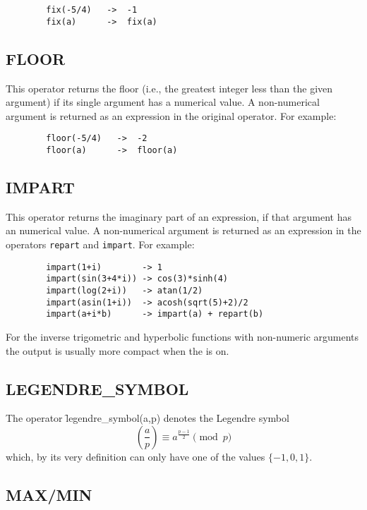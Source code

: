 \begin{verbatim}
        fix(-5/4)   ->  -1
        fix(a)      ->  fix(a)
\end{verbatim}

\subsection{FLOOR}
\hypertarget{operator:FLOOR}{}
This operator returns the floor (i.e., the greatest integer less than
the given argument) if its single argument has a numerical value.  A
non-numerical argument is returned as an expression in the original
operator.  For example:

\begin{verbatim}
        floor(-5/4)   ->  -2
        floor(a)      ->  floor(a)
\end{verbatim}

\subsection{IMPART}
\hypertarget{operator:IMPART}{}
This operator returns the imaginary part of an expression, if that argument
has an numerical value.  A non-numerical argument is returned as an expression
in the operators \texttt{repart} and \texttt{impart}.  For example:
\begin{verbatim}
        impart(1+i)        -> 1
        impart(sin(3+4*i)) -> cos(3)*sinh(4)
        impart(log(2+i))   -> atan(1/2)
        impart(asin(1+i))  -> acosh(sqrt(5)+2)/2
        impart(a+i*b)      -> impart(a) + repart(b)
\end{verbatim}

For the inverse trigometric and hyperbolic functions with non-numeric arguments the output is usually more compact when the  is on.

\subsection{LEGENDRE\_SYMBOL}
\hypertarget{operator:LEGENDRE_SYMBOL}{}
The operator \f{legendre\_symbol}(a,p) denotes the Legendre symbol
\[
  \left(\frac{a}{p}\right) \equiv a^{\frac{p-1}{2}} \pmod{p}
\]
which, by its very definition can only have one of the values $\{-1,0,1\}$.

\subsection{MAX/MIN}
\hypertarget{operator:MAX}{}
\hypertarget{operator:MIN}{}

